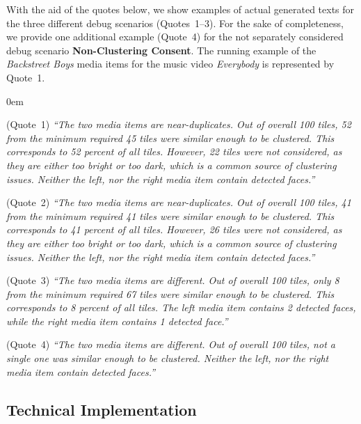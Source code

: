 \documentclass{article}
\begin{document}
With the aid of the quotes below,
we show examples of actual generated texts
for the three different debug scenarios (Quotes~1--3).
For the sake of completeness, we provide one additional example (Quote~4)
for the not separately considered debug scenario \textbf{Non-Clustering Consent}.
The running example of the \emph{Backstreet Boys} media items
for the music video \emph{Everybody}
is represented by Quote~1.

\begin{description}
  \itemsep0em
  \item[Clustering Consent]
      (Quote~1) \textit{``The two media items are near-duplicates.
      Out of overall 100 tiles, 52 from the minimum required 45 tiles
      were similar enough to be clustered.
      This corresponds to 52 percent of all tiles.
      However, 22 tiles were not considered,
      as they are either too bright or too dark,
      which is a common source of clustering issues.
      Neither the left, nor the right media item contain detected faces.''}
  \item[Clustering Dissent]
      (Quote~2) \textit{``The two media items are near-duplicates.
      Out of overall 100 tiles, 41 from the minimum required 41 tiles were similar
      enough to be clustered.
      This corresponds to 41 percent of all tiles.
      However, 26 tiles were not considered, as they are either too bright
      or too dark, which is a common source of clustering issues.
      Neither the left, nor the right media item contain detected faces.''}
  \item[Non-Clustering Dissent]
      (Quote~3) \textit{``The two media items are different.
      Out of overall 100 tiles, only 8 from the minimum required 67 tiles
      were similar enough to be clustered.
      This corresponds to 8 percent of all tiles.
      The left media item contains 2 detected faces,
      while the right media item contains 1 detected face.''}
  \item[(Non-Clustering Consent)]
      (Quote~4) \textit{``The two media items are different.
      Out of overall 100 tiles, not a single one was similar enough
      to be clustered.
      Neither the left, nor the right media item contain detected faces.''}
\end{description}

\subsection{Technical Implementation}
\end{document}
